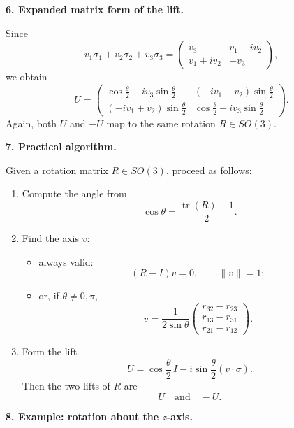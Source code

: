 \documentclass[12pt,a4paper]{article}
\theoremstyle{notespace}
\begin{document}
\medskip

\textbf{6. Expanded matrix form of the lift.}

Since
\[
v_1\sigma_1+v_2\sigma_2+v_3\sigma_3
=
\begin{pmatrix}
	v_3 & v_1-i v_2\\
	v_1+i v_2 & -v_3
\end{pmatrix},
\]
we obtain
\[
\boxed{
	U=
	\begin{pmatrix}
		\cos\frac{\theta}{2}-i v_3\sin\frac{\theta}{2}
		&
		(-i v_1-v_2)\sin\frac{\theta}{2}
		\\[6pt]
		(-i v_1+v_2)\sin\frac{\theta}{2}
		&
		\cos\frac{\theta}{2}+i v_3\sin\frac{\theta}{2}
	\end{pmatrix}.
}
\]
Again, both \(U\) and \(-U\) map to the same rotation \(R\in SO(3)\).

\medskip

\textbf{7. Practical algorithm.}

Given a rotation matrix \(R\in SO(3)\), proceed as follows:

\begin{enumerate}
	\item Compute the angle from
	\[
	\cos\theta=\frac{\operatorname{tr}(R)-1}{2}.
	\]
	
	\item Find the axis \(v\):
	\begin{itemize}
		\item always valid:
		\[
		(R-I)v=0,
		\qquad
		\|v\|=1;
		\]
		\item or, if \(\theta\neq 0,\pi\),
		\[
		v=
		\frac{1}{2\sin\theta}
		\begin{pmatrix}
			r_{32}-r_{23}\\
			r_{13}-r_{31}\\
			r_{21}-r_{12}
		\end{pmatrix}.
		\]
	\end{itemize}
	
	\item Form the lift
	\[
	U=\cos\frac{\theta}{2}\,I-i\sin\frac{\theta}{2}(v\cdot \sigma).
	\]
	Then the two lifts of \(R\) are
	\[
	\boxed{U\quad\text{and}\quad -U.}
	\]
\end{enumerate}

\medskip

\textbf{8. Example: rotation about the \(z\)-axis.}
\end{document}
